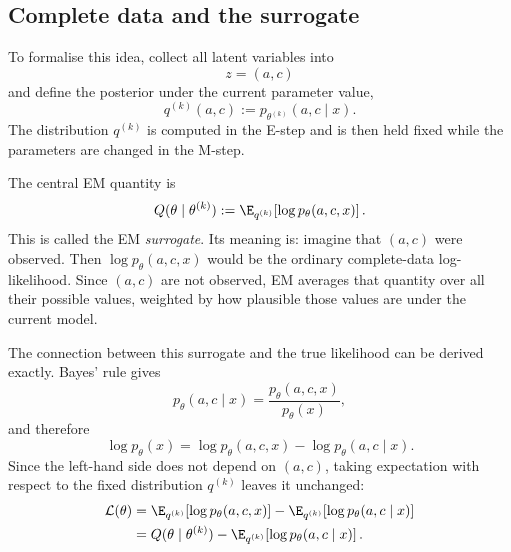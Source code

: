 \subsection{Complete data and the surrogate}

To formalise this idea, collect all latent variables into
\begin{equation}
  z=(a,c)
\end{equation}
and define the posterior under the current parameter value,
\begin{equation}
  q^{(k)}(a,c)
  :=
  p_{\theta^{(k)}}(a,c\mid x).
  \label{eq:em-q-def}
\end{equation}
The distribution $q^{(k)}$ is computed in the E-step and is then held fixed
while the parameters are changed in the M-step.

The central EM quantity is
\begin{equation}
  Q(\theta\mid\theta^{(k)})
  :=
  \E_{q^{(k)}}\!
  \left[
    \log p_\theta(a,c,x)
  \right].
  \label{eq:em-Q-def}
\end{equation}
This is called the EM \emph{surrogate}. Its meaning is: imagine that
$(a,c)$ were observed. Then $\log p_\theta(a,c,x)$ would be the ordinary
complete-data log-likelihood. Since $(a,c)$ are not observed, EM averages that
quantity over all their possible values, weighted by how plausible those
values are under the current model.

The connection between this surrogate and the true likelihood can be derived
exactly. Bayes' rule gives
\begin{equation}
  p_\theta(a,c\mid x)
  =
  \frac{p_\theta(a,c,x)}{p_\theta(x)},
\end{equation}
and therefore
\begin{equation}
  \log p_\theta(x)
  =
  \log p_\theta(a,c,x)
  -
  \log p_\theta(a,c\mid x).
  \label{eq:em-bayes-log}
\end{equation}
Since the left-hand side does not depend on $(a,c)$, taking expectation with
respect to the fixed distribution $q^{(k)}$ leaves it unchanged:
\begin{align}
  \mathcal L(\theta)
  &=
  \E_{q^{(k)}}\!
  \left[
    \log p_\theta(a,c,x)
  \right]
  -
  \E_{q^{(k)}}\!
  \left[
    \log p_\theta(a,c\mid x)
  \right]
  \nonumber\\
  &=
  Q(\theta\mid\theta^{(k)})
  -
  \E_{q^{(k)}}\!
  \left[
    \log p_\theta(a,c\mid x)
  \right].
  \label{eq:em-first-decomposition}
\end{align}

